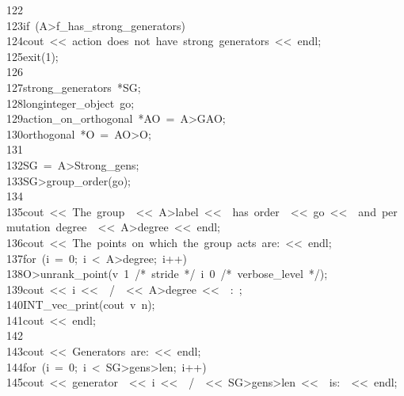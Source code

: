 \begin{tabbing}
122\>\\[0pt]
123\>\>if\ (A>f\_has\_strong\_generators)\ \\[0pt]
124\>\>\>cout\ <<\ action\ does\ not\ have\ strong\ generators\ <<\ endl;\\[0pt]
125\>\>\>exit(1);\\[0pt]
126\>\>\>\\[0pt]
127\>\>strong\_generators\ *SG;\\[0pt]
128\>\>longinteger\_object\ go;\\[0pt]
129\>\>action\_on\_orthogonal\ *AO\ =\ A>GAO;\\[0pt]
130\>\>orthogonal\ *O\ =\ AO>O;\\[0pt]
131\>\\[0pt]
132\>\>SG\ =\ A>Strong\_gens;\\[0pt]
133\>\>SG>group\_order(go);\\[0pt]
134\>\\[0pt]
135\>\>cout\ <<\ The\ group\ \ <<\ A>label\ <<\ \ has\ order\ \ <<\ go\ <<\ \ and\ permutation\ degree\ \ <<\ A>degree\ <<\ endl;\\[0pt]
136\>\>cout\ <<\ The\ points\ on\ which\ the\ group\ acts\ are:\ <<\ endl;\\[0pt]
137\>\>for\ (i\ =\ 0;\ i\ <\ A>degree;\ i++)\ \\[0pt]
138\>\>\>O>unrank\_point(v\ 1\ /*\ stride\ */\ i\ 0\ /*\ verbose\_level\ */);\\[0pt]
139\>\>\>cout\ <<\ i\ <<\ \ /\ \ <<\ A>degree\ <<\ \ :\ ;\\[0pt]
140\>\>\>INT\_vec\_print(cout\ v\ n);\\[0pt]
141\>\>\>cout\ <<\ endl;\\[0pt]
142\>\>\>\\[0pt]
143\>\>cout\ <<\ Generators\ are:\ <<\ endl;\\[0pt]
144\>\>for\ (i\ =\ 0;\ i\ <\ SG>gens>len;\ i++)\ \\[0pt]
145\>\>\>cout\ <<\ generator\ \ <<\ i\ <<\ \ /\ \ <<\ SG>gens>len\ <<\ \ is:\ \ <<\ endl;\\[0pt]

\end{tabbing}
